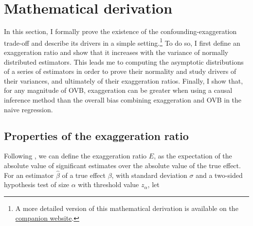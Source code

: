 \documentclass[usletter, 12pt]{article}
\begin{document}
		
	
	



	
	\section{Mathematical derivation} \label{maths}
						
		In this section, I formally prove the existence of the confounding-exaggeration trade-off  and describe its drivers in a simple setting.\footnote{A more detailed version of this mathematical derivation is available on the \href{https://vincentbagilet.github.io/causal_exaggeration/Maths/math_causal_exaggeration.pdf}{companion website}.} To do so, I first define an exaggeration ratio  and show that it increases with the variance of normally distributed estimators. This leads me to computing the asymptotic distributions of a series of estimators in order to prove their normality and study drivers of their variances, and ultimately of their exaggeration ratios. Finally, I show that, for any magnitude of OVB, exaggeration can be greater when using a causal inference method than the overall bias combining exaggeration and OVB in the naive regression.
		
		
		\subsection{Properties of the exaggeration ratio}\label{general_exagg}
		
			Following  \cite{gelman_beyond_2014}, we can define the exaggeration ratio $E$, as the expectation of the absolute value of significant estimates over the absolute value of the true effect. For an estimator $\hat{\beta}$ of a true effect $\beta$, with standard deviation $\sigma$ and a two-sided hypothesis test of size $\alpha$ with threshold value $z_{\alpha}$, let
			
		 
\end{document}
